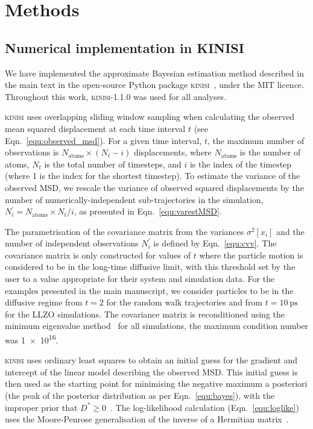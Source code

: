 \documentclass[reprint,superscriptaddress,nobibnotes,amsmath,amssymb,aps,prx,hidelinks,linenumbers]{revtex4-2}
\newcommand{\oMSDi}{\ensuremath{x_i}}
\newcommand{\nind}[1]{\ensuremath{N^\prime_{#1}}}
\newcommand{\D}{\ensuremath{D^*}}
\newcommand{\var}[1]{\ensuremath{\sigma^2[#1]}}
\begin{document}
\section{Methods}

\subsection{Numerical implementation in KINISI}
\label{sec:implementation}
We have implemented the approximate Bayesian estimation method described in the main text in the open-source Python package \textsc{kinisi}~\cite{mccluskey_kinisi_2022}, under the MIT licence.
Throughout this work, \textsc{kinisi}-1.1.0 was used for all analyses.  

\textsc{kinisi} uses overlapping sliding window sampling when calculating the observed mean squared displacement at each time interval $t$ (see Eqn.~\ref{equ:observed_msd}).
For a given time interval, $t$, the maximum number of observations is $N_{\mathrm{atoms}} \times (N_{t} - i)$ displacements, where $N_{\mathrm{atoms}}$ is the number of atoms, $N_{t}$ is the total number of timesteps, and $i$ is the index of the timestep (where \num{1} is the index for the shortest timestep).
To estimate the variance of the observed MSD, we rescale the variance of observed squared displacements by the number of numerically-independent sub-trajectories in the simulation, $\nind{i} = N_{\mathrm{atoms}} \times N_{t} / i$, as presented in Eqn.~\ref{equ:varestMSD}.  

The parametrisation of the covariance matrix from the variances $\var{\oMSDi}$ and the number of independent observations $\nind{i}$ is defined by Eqn.~\ref{equ:cvv}. 
The covariance matrix is only constructed for values of $t$ where the particle motion is considered to be in the long-time diffusive limit, with this threshold set by the user to a value appropriate for their system and simulation data. 
For the examples presented in the main manuscript, we consider particles to be in the diffusive regime from $t=\num{2}$ for the random walk trajectories and from $t=\SI{10}{\pico\second}$ for the LLZO simulations.
The covariance matrix is reconditioned using the minimum eigenvalue method~\cite{tabeart_improving_2020} for all simulations, the maximum condition number was \num{1e16}.

\textsc{kinisi} uses ordinary least squares to obtain an initial guess for the gradient and intercept of the linear model describing the observed MSD.
This initial guess is then used as the starting point for minimising the negative maximum a posteriori (the peak of the posterior distribution as per Eqn.~\ref{equ:bayes}), with the improper prior that $\D \ge 0$~\cite{broyden_convergence_1970,fletcher_new_1970,goldfarb_family_1970,shanno_conditioning_1970}.
The log-likelihood calculation (Eqn.~\ref{equ:loglike}) uses the Moore-Penrose generalisation of the inverse of a Hermitian matrix~\cite{moore_on_1920,bjerhammar_application_1951,penrose_generlized_1955}. 
\end{document}
